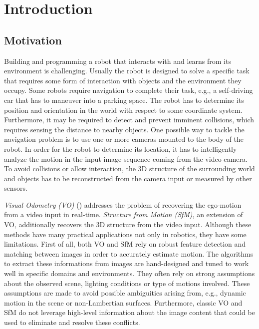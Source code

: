 \chapter{Introduction}\label{chp:introduction}
		
	\section{Motivation}
		
		Building and programming a robot that interacts with and learns from its environment is challenging.
		Usually the robot is designed to solve a specific task that requires some form of interaction with objects and the environment they occupy.
		Some robots require navigation to complete their task, e.g., a self-driving car that has to maneuver into a parking space.
		The robot has to determine its position and orientation in the world with respect to some coordinate system.
		Furthermore, it may be required to detect and prevent imminent collisions, which requires sensing the distance to nearby objects.
		One possible way to tackle the navigation problem is to use one or more cameras mounted to the body of the robot.
		In order for the robot to determine its location, it has to intelligently analyze the motion in the input image sequence coming from the video camera.
		To avoid collisions or allow interaction, the 3D structure of the surrounding world and objects has to be reconstructed from the camera input or measured by other sensors.
		
		\emph{Visual Odometry (VO)} (\cite{nister2004visual}) addresses the problem of recovering the ego-motion from a video input in real-time. 
		\emph{Structure from Motion (SfM)}, an extension of VO, additionally recovers the 3D structure from the video input.
		Although these methods have many practical applications not only in robotics, they have some limitations.
		First of all, both VO and SfM rely on robust feature detection and matching between images in order to accurately estimate motion.
		The algorithms to extract these informations from images are hand-designed and tuned to work well in specific domains and environments.
		They often rely on strong assumptions about the observed scene, lighting conditions or type of motions involved.
		These assumptions are made to avoid possible ambiguities arising from, e.g., dynamic motion in the scene or non-Lambertian surfaces.
		Furthermore, classic VO and SfM do not leverage high-level information about the image content that could be used to eliminate and resolve these conflicts.
		
